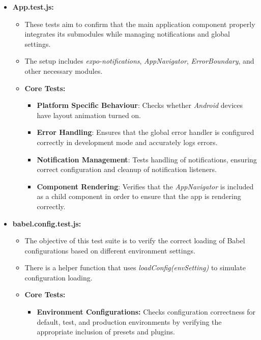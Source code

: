 \begin{itemize}
    \item \textbf{App.test.js:}
    \begin{itemize}
        \item These tests aim to confirm that the main application component properly integrates its submodules while managing notifications and global settings.
        \item The setup includes \textit{expo-notifications}, \textit{AppNavigator}, \textit{ErrorBoundary}, and other necessary modules.
        \item \textbf{Core Tests:}
        \begin{itemize}
            \item \textbf{Platform Specific Behaviour}: Checks whether \textit{Android} devices have layout animation turned on.
            \item \textbf{Error Handling}: Ensures that the global error handler is configured correctly in development mode and accurately logs errors.
            \item \textbf{Notification Management}: Tests handling of notifications, ensuring correct configuration and cleanup of notification listeners.
            \item \textbf{Component Rendering}: Verifies that the \textit{AppNavigator} is included as a child component in order to ensure that the app is rendering correctly.
        \end{itemize}
    \end{itemize}

    \item \textbf{babel.config.test.js:}
    \begin{itemize}
        \item The objective of this test suite is to verify the correct loading of Babel configurations based on different environment settings.
        \item There is a helper function that uses \textit{loadConfig(envSetting)} to simulate configuration loading.
        \item \textbf{Core Tests:}
        \begin{itemize}
            \item \textbf{Environment Configurations:} Checks configuration correctness for default, test, and production environments by verifying the appropriate inclusion of presets and plugins.
        \end{itemize}
    \end{itemize}


\end{itemize}
